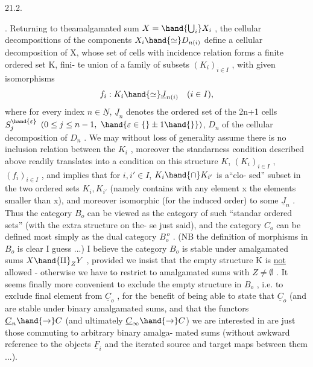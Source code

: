 21.2.

. Returning to theamalgamated sum $X = \hand{\bigcup_i}X_i$ , the cellular decompositions
of the components $X_i \hand{\simeq} D_{n(i)}$ define a cellular decomposition of X, whose
set of cells with incidence relation forms a finite ordered set K, fini-%
te union of a family of subsets $(K_i)_{i\in I}$ , with given isomorphisms
\[ f_i : K_i \hand{\simeq} \underline{J}_{n(i)} \quad (i\in I) , \]
where for every index $n\in \underline{N}$, $\underline{J}_n$ denotes the ordered set of the 2n+1
cells $S_j^{\hand{\varepsilon}}$ $(0\leq j\leq n-1,\ \hand{\varepsilon\in\{}\pm 1\hand{\}})$, $D_n$ of the   cellular decomposition
of $D_n$ . We may without loss of generality assume there is no inclusion
relation between the $K_i$ , moreover the standarness condition described
above readily translates into a condition on this structure
$K$, $(K_i)_{i\in I}$ , $(f_i)_{i\in I}$ , and implies that for $i,i'\in I$, $K_i\hand{\cap}K_{i'}$ is a``clo-%
sed'' subset in the two ordered sets $K_i,K_{i'}$ (namely contains with any
element x the elements smaller than x), and moreover isomorphic (for the
induced order) to some $\underline{J}_n$ . Thus the category $B_o$  can be viewed as the
category of such ``standar ordered sets'' (with the extra structure on the-%
se just said), and the category $C_o$ can be defined most simply as the
dual category $B_o^{\,o}$ . (NB the definition of morphisms in $B_o$ is clear I
guess ...) I believe the category $B_o$ is stable under amalgamated sums
$X\hand{\amalg}_Z Y$ , provided  we insist that the empty structure K is \uline{not} allowed -
otherwise we have to  restrict to amalgamated sums with $Z \neq \emptyset$ .
It seems finally more convenient to exclude the empty structure in $B_o$ ,
i.e. to exclude final element from $\underline{C}_o$ , for the benefit of being able to
state that $\underline{C}_o$ (and \hand{*}    are stable under binary
amalgamated sums, and that the functors $\underline{C}_n\hand{\to} C$ (and ultimately $\underline{C}_\infty\hand{\to} C$)
we are interested in are just those commuting to arbitrary binary amalga-%
mated sums (without  awkward reference to the objects $\underline{F}_i$ and the
iterated source and target maps between them ...).

